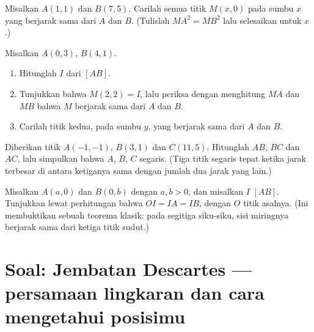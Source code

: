 \begin{exercise}[$\star\star$]\label{exo:g10:coordgeom:7}
Misalkan $A(1, 1)$ dan $B(7, 5)$. Carilah semua titik $M(x, 0)$ pada sumbu
$x$ yang berjarak sama dari $A$ dan $B$. (Tulislah $MA^2 = MB^2$ lalu
selesaikan untuk $x$.)
\end{exercise}

\begin{exercise}[$\star\star$]\label{exo:g10:coordgeom:8}
Misalkan $A(0, 3)$, $B(4, 1)$.
\begin{enumerate}
  \item Hitunglah   $I$ dari $[AB]$.
  \item Tunjukkan bahwa $M(2, 2) = I$, lalu periksa dengan menghitung $MA$
        dan $MB$ bahwa $M$ berjarak sama dari $A$ dan $B$.
  \item Carilah titik kedua, pada sumbu $y$, yang berjarak sama dari $A$ dan
        $B$.
\end{enumerate}
\end{exercise}

\begin{exercise}[$\star\star$]\label{exo:g10:coordgeom:9}
Diberikan titik $A(-1, -1)$, $B(3, 1)$ dan $C(11, 5)$. Hitunglah $AB$,
$BC$ dan $AC$, lalu simpulkan bahwa $A$, $B$, $C$ segaris. (Tiga titik
segaris tepat ketika jarak terbesar di antara ketiganya sama dengan jumlah
dua jarak yang lain.)
\end{exercise}

\begin{exercise}[$\star\star\star$]\label{exo:g10:coordgeom:10}
Misalkan $A(a, 0)$ dan $B(0, b)$ dengan $a, b > 0$, dan misalkan $I$  $[AB]$. Tunjukkan lewat perhitungan bahwa $OI = IA = IB$, dengan $O$
titik asalnya. (Ini membuktikan sebuah teorema klasik: pada segitiga
siku-siku,  sisi miringnya berjarak sama dari ketiga titik sudut.)
\end{exercise}

\section{Soal: Jembatan Descartes --- persamaan lingkaran dan cara
mengetahui posisimu}

